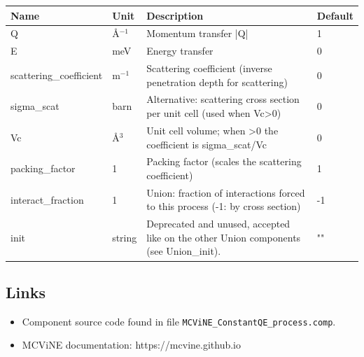 \begin{longtable}{p{}p{}p{}p{}}
\toprule
\textbf{Name} & \textbf{Unit} & \textbf{Description} & \textbf{Default} \\
\midrule
\endhead
Q & \AA{}$^{-1}$ & Momentum transfer |Q| & 1 \\
E & meV & Energy transfer & 0 \\
scattering\_coefficient & m$^{-1}$ & Scattering coefficient (inverse penetration depth for scattering) & 0 \\
sigma\_scat & barn & Alternative: scattering cross section per unit cell (used when Vc\textgreater{}0) & 0 \\
Vc & \AA{}$^{3}$ & Unit cell volume; when \textgreater{}0 the coefficient is sigma\_scat/Vc & 0 \\
packing\_factor & 1 & Packing factor (scales the scattering coefficient) & 1 \\
interact\_fraction & 1 & Union: fraction of interactions forced to this process (-1: by cross section) & -1 \\
init & string & Deprecated and unused, accepted like on the other Union components (see Union\_init). & "" \\
\bottomrule
\end{longtable}

\subsection*{Links}
\begin{itemize}
  \item Component source code found in file \texttt{MCViNE\_ConstantQE\_process.comp}.
  \item MCViNE documentation: https://mcvine.github.io
\end{itemize}
